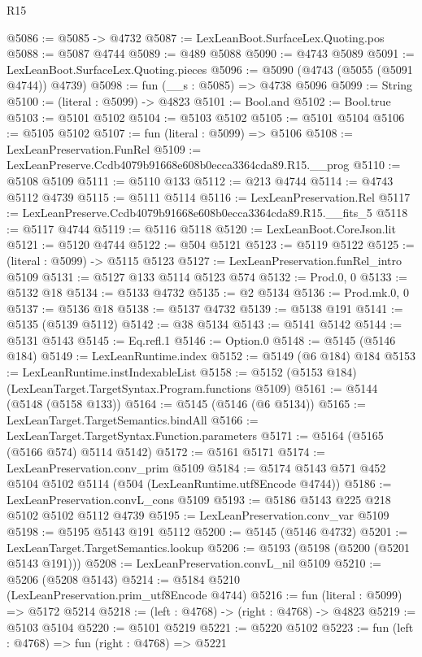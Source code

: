 \begin{lexlean}{R15}
\begin{coremodule}
{{{{{{{{{{{@5086 := @5085 -> @4732
@5087 := LexLeanBoot.SurfaceLex.Quoting.pos
@5088 := @5087 @4744
@5089 := @489 @5088
@5090 := @4743 @5089
@5091 := LexLeanBoot.SurfaceLex.Quoting.pieces
@5096 := @5090 (@4743 (@5055 (@5091 @4744)) @4739)
@5098 := fun (__s : @5085) => @4738 @5096
@5099 := String
@5100 := (literal : @5099) -> @4823
@5101 := Bool.and
@5102 := Bool.true
@5103 := @5101 @5102
@5104 := @5103 @5102
@5105 := @5101 @5104
@5106 := @5105 @5102
@5107 := fun (literal : @5099) => @5106
@5108 := LexLeanPreservation.FunRel
@5109 := LexLeanPreserve.Ccdb4079b91668e608b0ecca3364cda89.R15.__prog
@5110 := @5108 @5109
@5111 := @5110 @133
@5112 := @213 @4744
@5114 := @4743 @5112 @4739
@5115 := @5111 @5114
@5116 := LexLeanPreservation.Rel
@5117 := LexLeanPreserve.Ccdb4079b91668e608b0ecca3364cda89.R15.__fits_5
@5118 := @5117 @4744
@5119 := @5116 @5118
@5120 := LexLeanBoot.CoreJson.lit
@5121 := @5120 @4744
@5122 := @504 @5121
@5123 := @5119 @5122
@5125 := (literal : @5099) -> @5115 @5123
@5127 := LexLeanPreservation.funRel_intro @5109
@5131 := @5127 @133 @5114 @5123 @574
@5132 := Prod.{0, 0}
@5133 := @5132 @18
@5134 := @5133 @4732
@5135 := @2 @5134
@5136 := Prod.mk.{0, 0}
@5137 := @5136 @18
@5138 := @5137 @4732
@5139 := @5138 @191
@5141 := @5135 (@5139 @5112)
@5142 := @38 @5134
@5143 := @5141 @5142
@5144 := @5131 @5143
@5145 := Eq.refl.{1}
@5146 := Option.{0}
@5148 := @5145 (@5146 @184)
@5149 := LexLeanRuntime.index
@5152 := @5149 (@6 @184) @184
@5153 := LexLeanRuntime.instIndexableList
@5158 := @5152 (@5153 @184) (LexLeanTarget.TargetSyntax.Program.functions @5109)
@5161 := @5144 (@5148 (@5158 @133))
@5164 := @5145 (@5146 (@6 @5134))
@5165 := LexLeanTarget.TargetSemantics.bindAll
@5166 := LexLeanTarget.TargetSyntax.Function.parameters
@5171 := @5164 (@5165 (@5166 @574) @5114 @5142)
@5172 := @5161 @5171
@5174 := LexLeanPreservation.conv_prim @5109
@5184 := @5174 @5143 @571 @452 @5104 @5102 @5114 (@504 (LexLeanRuntime.utf8Encode @4744))
@5186 := LexLeanPreservation.convL_cons @5109
@5193 := @5186 @5143 @225 @218 @5102 @5102 @5112 @4739
@5195 := LexLeanPreservation.conv_var @5109
@5198 := @5195 @5143 @191 @5112
@5200 := @5145 (@5146 @4732)
@5201 := LexLeanTarget.TargetSemantics.lookup
@5206 := @5193 (@5198 (@5200 (@5201 @5143 @191)))
@5208 := LexLeanPreservation.convL_nil @5109
@5210 := @5206 (@5208 @5143)
@5214 := @5184 @5210 (LexLeanPreservation.prim_utf8Encode @4744)
@5216 := fun (literal : @5099) => @5172 @5214
@5218 := (left : @4768) -> (right : @4768) -> @4823
@5219 := @5103 @5104
@5220 := @5101 @5219
@5221 := @5220 @5102
@5223 := fun (left : @4768) => fun (right : @4768) => @5221
}}}}}}}}}}}
\end{coremodule}
\end{lexlean}
